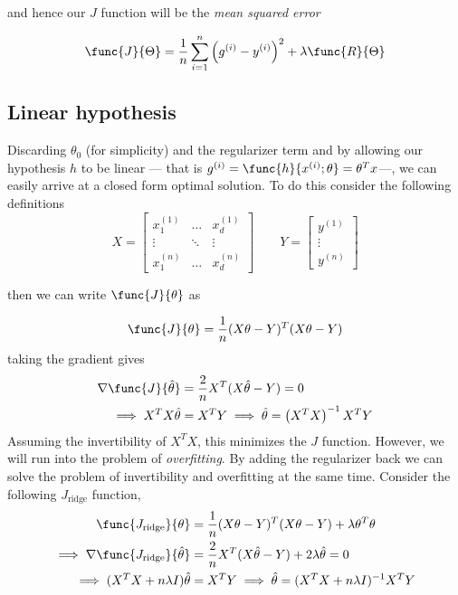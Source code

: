 and hence our \(J\) function will be the \textit{mean squared error} 

\begin{equation*}
    \func{J}{\Theta} = \dfrac{1}{n} \sum_{i = 1}^n \left( g^{(i)} - y^{(i)} \right)^2 + \lambda \func{R}{\Theta}
\end{equation*}

\subsection{Linear hypothesis}
Discarding \(\theta_0\) (for simplicity) and the regularizer term and by allowing our hypothesis \(h\) to be linear --- that is \(g^{(i)} = \func{h}{x^{(i)}; \theta} = \theta^T x\)---, we can easily arrive at a closed form optimal solution. To do this consider the following definitions 
\begin{equation*}
    X = \begin{bmatrix}
        x^{(1)}_1 & \dots & x^{(1)}_d \\
        \vdots & \ddots & \vdots\\
        x^{(n)}_1 & \dots & x^{(n)}_d
    \end{bmatrix} \qquad Y = \begin{bmatrix}
        y^{(1)}\\
        \vdots \\
        y^{(n)} 
    \end{bmatrix}
\end{equation*}

then we can write \(\func{J}{\theta}\) as

\begin{equation*}
    \func{J}{\theta} = \frac{1}{n} (X\theta - Y)^T (X\theta-Y)
\end{equation*}
taking the gradient gives 
\begin{align*}
    \nabla \func{J}{\hat{\theta}} &= \dfrac{2}{n} X^T (X\hat{\theta} - Y) = 0\\
    \implies  X^T X\hat{\theta} &= X^T Y \implies \hat{\theta} = \left(X^T X\right)^{-1} X^T Y
\end{align*}
Assuming the invertibility of \(X^TX\), this minimizes the \(J\) function. However, we will run into the problem of \textit{overfitting}. By adding the regularizer back we can solve the problem of invertibility and overfitting at the same time. Consider the following \(J_{\mathrm{ridge}}\) function, 
\begin{align*}
    \func{J_{\mathrm{ridge}}}{\theta} &= \frac{1}{n} (X\theta - Y)^T (X\theta-Y) + \lambda \theta^T \theta \\
     \implies \nabla \func{J_{\mathrm{ridge}}}{\hat{\theta}} &= \dfrac{2}{n} X^T (X\hat{\theta} - Y) + 2\lambda \hat{\theta}  = 0\\ 
     \implies  (X^TX + n \lambda I) \hat{\theta} &= X^T Y \implies \hat{\theta}  = (X^TX + n \lambda I )^{-1} X^T Y
\end{align*}

